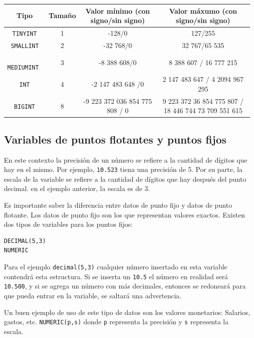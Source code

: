 \begin{table}[H]
    \centering
    \begin{tabular}{c|c|c|c|}
    \hline
        Tipo & Tamaño & Valor mínimo (con signo/sin signo) & Valor máxumo (con signo/sin signo)  \\ \hline
        \texttt{ TINYINT }  & 1  & -128/0  & 127/255\\ \hline
        \texttt{ SMALLINT } & 2  &  -32 768/0 & 32 767/65 535\\ \hline
        \texttt{ MEDIUMINT }& 3  &  -8 388 608/0 & 8 388 607 / 16 777 215 \\ \hline
        \texttt{ INT }      & 4  & -2 147 483 648 /0  & 2 147 483 647 / 4 2094 967 295 \\ \hline
        \texttt{ BIGINT }   & 8  & -9 223 372 036 854 775 808 / 0 &  9 223 372 36 854 775 807 / 18 446 744 73 709 551 615\\ \hline
    \end{tabular}
\end{table}

\subsection{Variables de puntos flotantes y puntos fijos}

En este contexto la precisión de un número se refiere a la cantidad de dígitos que hay en el mismo. Por ejemplo, \texttt{10.523} tiena una precisión de 5. Por su parte, la escala de la variable se refiere a la cantidad de dígitos que hay después del punto decimal. en el ejemplo anterior, la escala es de 3.

Es importante saber la diferencia entre datos de punto fijo y datos de punto flotante. Los datos de punto fijo son los que representan valores exactos. Existen dos tipos de variables para los puntos fijos:

\begin{verbatim}
DECIMAL(5,3)
NUMERIC
\end{verbatim}
Para el ejemplo \texttt{decimal(5,3)} cualquier número insertado en esta variable contendrá esta estructura. Si se inserta un \texttt{10.5} el número en realidad será \texttt{10.500}, y si se agrega un número con más decimales, entonces se redoneará para que pueda entrar en la variable, se saltará una advertencia.

Un buen ejemplo de uso de este tipo de datos son los valores monetarios: Salarios, gastos, etc. \texttt{NUMERIC(p,s)} donde \texttt{p} representa la precisión y \texttt{s} representa la escala.


